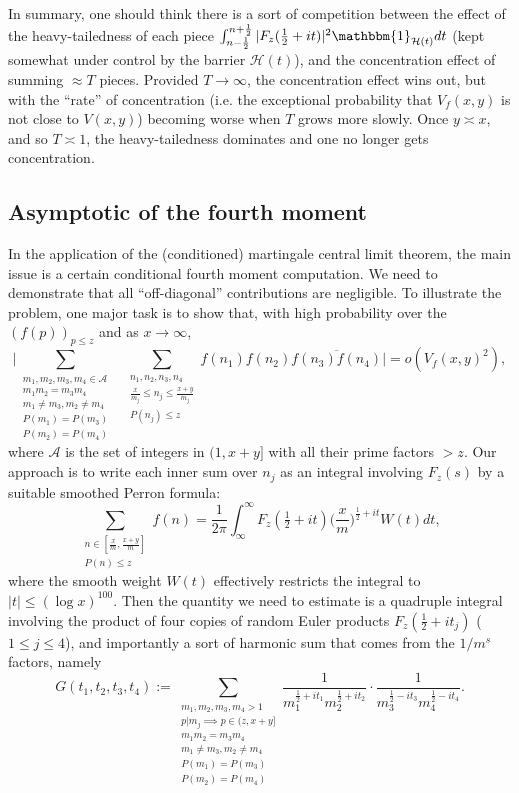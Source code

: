 \documentclass[12pt, notitlepage]{amsart}
\numberwithin{equation}{section}
\def\P{\mathbb P}
\def\CA{\mathcal{A}}
\theoremstyle{remark}
\theoremstyle{definition}
\theoremstyle{remark}
\numberwithin{equation}{section}
\begin{document}
In summary, one should think there is a sort of competition between the effect of the heavy-tailedness of each piece $\int_{n-\frac 12}^{n+\frac 12}|F_z(\frac 12+it)|^{2} \mathbbm{1}_{\mathcal{H}(t)} dt$ (kept somewhat under control by the barrier $\mathcal{H}(t)$), and the concentration effect of summing $\approx T$ pieces. Provided $T \rightarrow \infty$, the concentration effect wins out, but with the ``rate'' of concentration (i.e. the exceptional probability that $V_f(x, y)$ is not close to $V(x, y)$) becoming worse when $T$ grows more slowly. Once $y \asymp x$, and so $T \asymp 1$, the heavy-tailedness dominates and one no longer gets concentration.


\subsection{Asymptotic of the fourth moment}
In the application of the (conditioned) martingale central limit theorem, the main issue is a certain conditional fourth moment computation. We need to demonstrate that all ``off-diagonal'' contributions are negligible. To illustrate the problem, one major task is to show that, with high probability over the $(f(p))_{p \leq z}$ and as $x\to \infty$, 
\[ 
\Big| \sum_{\substack{ m_1, m_2, m_3, m_4 \in \CA \\ m_1 m_2= m_3 m_4 \\ m_1 \neq m_3, m_2\neq m_4 \\ P(m_1)=P(m_3) \\ P(m_2)=P(m_4)}} \ \ \ 
\sum_{\substack{n_1, n_2, n_3, n_4 \\ \frac{x}{m_j} \le n_j \le \frac{x+y}{m_j} \\ P(n_j)\le z}} f(n_1)f(n_2)\overline{f(n_3) f(n_4)}  \Big| =o(V_f(x, y)^2),
\]
where $\CA$ is the set of integers in $(1,x+y]$ with all their prime factors $> z$.
Our approach is to write each inner sum over $n_j$ as an integral involving $F_z(s)$ by a suitable smoothed Perron formula: 
\[ 
\sum_{\substack{n \in [\frac{x}{m}, \frac{x+y}{m}]\\P(n)\le z}} f(n) =  \frac{1}{2\pi }\int_{\infty}^{\infty} F_z(\tfrac 12 +it) \Big(\frac{x}{m}\Big)^{\frac 12+it} W(t)dt,
\]
where the smooth weight $W(t)$ effectively restricts the integral to $|t|\le (\log x)^{100}$.  
  Then the quantity we need to estimate is a quadruple integral involving the product of four copies of random Euler products $F_z(\frac 12+ it_j)$ ($1\le j \le 4$), and importantly a sort of harmonic sum that comes from the $1/m^{s}$ factors, namely 
\[
G(t_1, t_2, t_3, t_4):= \sum_{\substack{m_1, m_2, m_3, m_4 >1\\ p|m_j \implies p\in (z,x+y] \\ m_1m_2=m_3m_4\\ m_1\neq m_3, m_2\neq m_4 \\ P(m_1)= P(m_3) \\ P(m_2) =P(m_4) }} \frac{1}{m_1^{\frac 12 + it_1}m_2^{\frac 12 + it_2}} \cdot \frac{1}{m_3^{\frac 12 - it_3}m_4^{\frac 12 - it_4}} . 
\]
\end{document}
